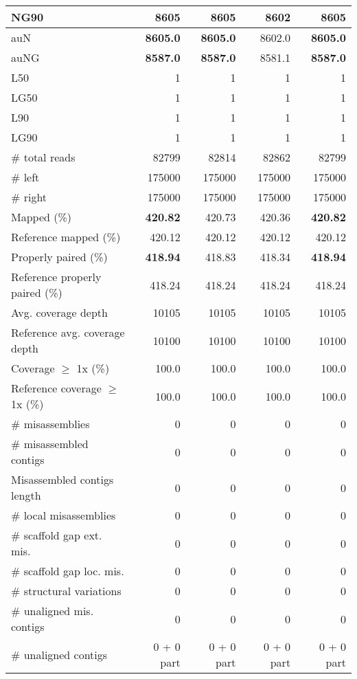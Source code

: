 \documentclass[12pt,a4paper]{article}
\begin{document}
\begin{table}[ht]
\begin{center}
\begin{tabular}{|l*{4}{|r}|}
NG90 & {\bf 8605} & {\bf 8605} & 8602 & {\bf 8605} \\ \hline
auN & {\bf 8605.0} & {\bf 8605.0} & 8602.0 & {\bf 8605.0} \\ \hline
auNG & {\bf 8587.0} & {\bf 8587.0} & 8581.1 & {\bf 8587.0} \\ \hline
L50 & 1 & 1 & 1 & 1 \\ \hline
LG50 & 1 & 1 & 1 & 1 \\ \hline
L90 & 1 & 1 & 1 & 1 \\ \hline
LG90 & 1 & 1 & 1 & 1 \\ \hline
\# total reads & 82799 & 82814 & 82862 & 82799 \\ \hline
\# left & 175000 & 175000 & 175000 & 175000 \\ \hline
\# right & 175000 & 175000 & 175000 & 175000 \\ \hline
Mapped (\%) & {\bf 420.82} & 420.73 & 420.36 & {\bf 420.82} \\ \hline
Reference mapped (\%) & 420.12 & 420.12 & 420.12 & 420.12 \\ \hline
Properly paired (\%) & {\bf 418.94} & 418.83 & 418.34 & {\bf 418.94} \\ \hline
Reference properly paired (\%) & 418.24 & 418.24 & 418.24 & 418.24 \\ \hline
Avg. coverage depth & 10105 & 10105 & 10105 & 10105 \\ \hline
Reference avg. coverage depth & 10100 & 10100 & 10100 & 10100 \\ \hline
Coverage $\geq$ 1x (\%) & 100.0 & 100.0 & 100.0 & 100.0 \\ \hline
Reference coverage $\geq$ 1x (\%) & 100.0 & 100.0 & 100.0 & 100.0 \\ \hline
\# misassemblies & 0 & 0 & 0 & 0 \\ \hline
\# misassembled contigs & 0 & 0 & 0 & 0 \\ \hline
Misassembled contigs length & 0 & 0 & 0 & 0 \\ \hline
\# local misassemblies & 0 & 0 & 0 & 0 \\ \hline
\# scaffold gap ext. mis. & 0 & 0 & 0 & 0 \\ \hline
\# scaffold gap loc. mis. & 0 & 0 & 0 & 0 \\ \hline
\# structural variations & 0 & 0 & 0 & 0 \\ \hline
\# unaligned mis. contigs & 0 & 0 & 0 & 0 \\ \hline
\# unaligned contigs & 0 + 0 part & 0 + 0 part & 0 + 0 part & 0 + 0 part \\ \hline

\end{tabular}
\end{center}
\end{table}
\end{document}
